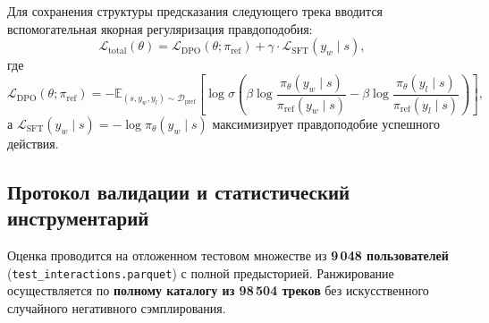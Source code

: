 Для сохранения структуры предсказания следующего трека вводится вспомогательная якорная регуляризация правдоподобия:
\begin{equation}
    \mathcal{L}_{\text{total}}(\theta) = \mathcal{L}_{\text{DPO}}(\theta; \pi_{\text{ref}}) + \gamma \cdot \mathcal{L}_{\text{SFT}}(y_w \mid s),
    \label{eq:dpo_sft}
\end{equation}
где
\begin{equation}
    \mathcal{L}_{\text{DPO}}(\theta; \pi_{\text{ref}}) = - \mathbb{E}_{(s, y_w, y_l) \sim \mathcal{D}_{\text{pref}}} \left[ \log \sigma \left( \beta \log \frac{\pi_\theta(y_w \mid s)}{\pi_{\text{ref}}(y_w \mid s)} - \beta \log \frac{\pi_\theta(y_l \mid s)}{\pi_{\text{ref}}(y_l \mid s)} \right) \right],
\end{equation}
а $\mathcal{L}_{\text{SFT}}(y_w \mid s) = - \log \pi_\theta(y_w \mid s)$ максимизирует правдоподобие успешного действия.

\subsection{Протокол валидации и статистический инструментарий}
Оценка проводится на отложенном тестовом множестве из \textbf{9\,048 пользователей} (\texttt{test\_interactions.parquet}) с полной предысторией. Ранжирование осуществляется по \textbf{полному каталогу из 98\,504 треков} без искусственного случайного негативного сэмплирования.

